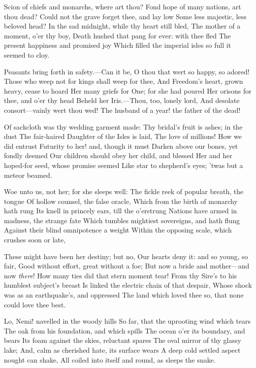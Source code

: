 \documentclass[10pt,twocolumn]{book}
\begin{document}
   Scion of chiefs and monarchs, where art thou?
   Fond hope of many nations, art thou dead?
   Could not the grave forget thee, and lay low
   Some less majestic, less beloved head?
   In the sad midnight, while thy heart still bled,
   The mother of a moment, o'er thy boy,
   Death hushed that pang for ever:  with thee fled
   The present happiness and promised joy
Which filled the imperial isles so full it seemed to cloy.


   Peasants bring forth in safety.---Can it be,
   O thou that wert so happy, so adored!
   Those who weep not for kings shall weep for thee,
   And Freedom's heart, grown heavy, cease to hoard
   Her many griefs for One; for she had poured
   Her orisons for thee, and o'er thy head
   Beheld her Iris.---Thou, too, lonely lord,
   And desolate consort---vainly wert thou wed!
The husband of a year! the father of the dead!


   Of sackcloth was thy wedding garment made:
   Thy bridal's fruit is ashes; in the dust
   The fair-haired Daughter of the Isles is laid,
   The love of millions!  How we did entrust
   Futurity to her! and, though it must
   Darken above our bones, yet fondly deemed
   Our children should obey her child, and blessed
   Her and her hoped-for seed, whose promise seemed
Like star to shepherd's eyes; 'twas but a meteor beamed.


   Woe unto us, not her; for she sleeps well:
   The fickle reek of popular breath, the tongue
   Of hollow counsel, the false oracle,
   Which from the birth of monarchy hath rung
   Its knell in princely ears, till the o'erstrung
   Nations have armed in madness, the strange fate
   Which tumbles mightiest sovereigns, and hath flung
   Against their blind omnipotence a weight
Within the opposing scale, which crushes soon or late,\textemdash


   These might have been her destiny; but no,
   Our hearts deny it:  and so young, so fair,
   Good without effort, great without a foe;
   But now a bride and mother---and now \textit{there}!
   How many ties did that stern moment tear!
   From thy Sire's to his humblest subject's breast
   Is linked the electric chain of that despair,
   Whose shock was as an earthquake's, and oppressed
The land which loved thee so, that none could love thee best.


   Lo, Nemi! navelled in the woody hills
   So far, that the uprooting wind which tears
   The oak from his foundation, and which spills
   The ocean o'er its boundary, and bears
   Its foam against the skies, reluctant spares
   The oval mirror of thy glassy lake;
   And, calm as cherished hate, its surface wears
   A deep cold settled aspect nought can shake,
All coiled into itself and round, as sleeps the snake.
\end{document}
